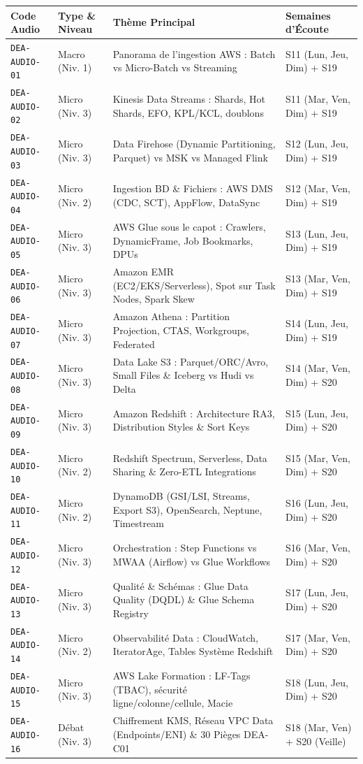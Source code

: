 \documentclass[11pt,a4paper]{article}
\begin{document}
\begin{table}[h!]
\centering
\footnotesize
\begin{tabularx}{\textwidth}{l l X l}
\toprule
\textbf{Code Audio} & \textbf{Type \& Niveau} & \textbf{Thème Principal} & \textbf{Semaines d'Écoute} \\
\midrule
\texttt{DEA-AUDIO-01} & Macro (Niv. 1) & Panorama de l'ingestion AWS : Batch vs Micro-Batch vs Streaming & S11 (Lun, Jeu, Dim) + S19 \\
\texttt{DEA-AUDIO-02} & Micro (Niv. 3) & Kinesis Data Streams : Shards, Hot Shards, EFO, KPL/KCL, doublons & S11 (Mar, Ven, Dim) + S19 \\
\texttt{DEA-AUDIO-03} & Micro (Niv. 3) & Data Firehose (Dynamic Partitioning, Parquet) vs MSK vs Managed Flink & S12 (Lun, Jeu, Dim) + S19 \\
\texttt{DEA-AUDIO-04} & Micro (Niv. 2) & Ingestion BD \& Fichiers : AWS DMS (CDC, SCT), AppFlow, DataSync & S12 (Mar, Ven, Dim) + S19 \\
\texttt{DEA-AUDIO-05} & Micro (Niv. 3) & AWS Glue sous le capot : Crawlers, DynamicFrame, Job Bookmarks, DPUs & S13 (Lun, Jeu, Dim) + S19 \\
\texttt{DEA-AUDIO-06} & Micro (Niv. 3) & Amazon EMR (EC2/EKS/Serverless), Spot sur Task Nodes, Spark Skew & S13 (Mar, Ven, Dim) + S19 \\
\texttt{DEA-AUDIO-07} & Micro (Niv. 3) & Amazon Athena : Partition Projection, CTAS, Workgroups, Federated & S14 (Lun, Jeu, Dim) + S19 \\
\texttt{DEA-AUDIO-08} & Micro (Niv. 3) & Data Lake S3 : Parquet/ORC/Avro, Small Files \& Iceberg vs Hudi vs Delta & S14 (Mar, Ven, Dim) + S20 \\
\texttt{DEA-AUDIO-09} & Micro (Niv. 3) & Amazon Redshift : Architecture RA3, Distribution Styles \& Sort Keys & S15 (Lun, Jeu, Dim) + S20 \\
\texttt{DEA-AUDIO-10} & Micro (Niv. 2) & Redshift Spectrum, Serverless, Data Sharing \& Zero-ETL Integrations & S15 (Mar, Ven, Dim) + S20 \\
\texttt{DEA-AUDIO-11} & Micro (Niv. 2) & DynamoDB (GSI/LSI, Streams, Export S3), OpenSearch, Neptune, Timestream & S16 (Lun, Jeu, Dim) + S20 \\
\texttt{DEA-AUDIO-12} & Micro (Niv. 3) & Orchestration : Step Functions vs MWAA (Airflow) vs Glue Workflows & S16 (Mar, Ven, Dim) + S20 \\
\texttt{DEA-AUDIO-13} & Micro (Niv. 3) & Qualité \& Schémas : Glue Data Quality (DQDL) \& Glue Schema Registry & S17 (Lun, Jeu, Dim) + S20 \\
\texttt{DEA-AUDIO-14} & Micro (Niv. 2) & Observabilité Data : CloudWatch, IteratorAge, Tables Système Redshift & S17 (Mar, Ven, Dim) + S20 \\
\texttt{DEA-AUDIO-15} & Micro (Niv. 3) & AWS Lake Formation : LF-Tags (TBAC), sécurité ligne/colonne/cellule, Macie & S18 (Lun, Jeu, Dim) + S20 \\
\texttt{DEA-AUDIO-16} & Débat (Niv. 3) & Chiffrement KMS, Réseau VPC Data (Endpoints/ENI) \& 30 Pièges DEA-C01 & S18 (Mar, Ven) + S20 (Veille) \\
\bottomrule
\end{tabularx}
\end{table}
\end{document}
